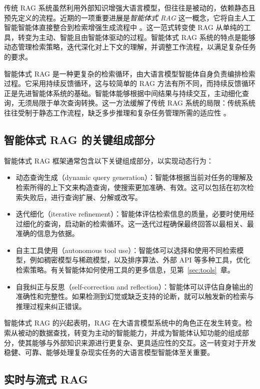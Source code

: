 传统 RAG 系统虽然利用外部知识增强大语言模型，但往往是被动的，依赖静态且预先定义的流程。近期的一项重要进展是\textit{智能体式 RAG} 这一概念，它将自主人工智能智能体直接整合到检索增强生成流程中 \citep{singh2025agentic}。这一范式转变使 RAG 从单纯的工具，转变为主动、智能且由智能体驱动的过程。智能体式 RAG 系统的特点是能够动态管理检索策略，迭代深化对上下文的理解，并调整工作流程，以满足复杂任务的要求。

智能体式 RAG 是一种更复杂的检索循环，由大语言模型智能体自身负责编排检索过程。它采用持续反馈循环，这与较简单的 RAG 方法有所不同，而持续反馈循环正是先进智能体系统的基础。智能体能够根据中间结果与持续交互，主动细化查询，无须局限于单次查询转换。这一方法缓解了传统 RAG 系统的局限：传统系统往往受制于静态工作流程，缺乏多步推理和复杂任务管理所需的适应性 \citep{singh2025agentic}。

\subsection{智能体式 RAG 的关键组成部分}

智能体式 RAG 框架通常包含以下关键组成部分，以实现动态行为：

\begin{itemize}
    \item 动态查询生成（dynamic query generation）：智能体根据当前对任务的理解及检索所得的上下文来构造查询，使搜索更加准确、有效。这可以包括在初次检索失败后，进行查询扩展、分解或改写。
    \item 迭代细化（iterative refinement）：智能体评估检索信息的质量，必要时使用经过细化的查询，启动新的检索循环。这一迭代过程确保最终回答以最相关、最准确的信息为依据。
    \item 自主工具使用（autonomous tool use）：智能体可以选择和使用不同检索模型，例如稠密模型与稀疏模型，以及排序算法、外部 API 等多种工具，优化检索策略。有关智能体如何使用工具的更多信息，见第~\ref{sec:tools}~章。
    \item 自我纠正与反思（self-correction and reflection）：智能体可以评估自身输出的准确性和完整性。如果检测到幻觉或缺乏支持的论断，就可以触发新的检索与推理过程来纠正错误。
\end{itemize}
智能体式 RAG 的兴起表明，RAG 在大语言模型系统中的角色正在发生转变。检索从被动的数据查找，转变为主动的智能能力，并成为智能体认知功能的组成部分，使其能够与外部知识来源进行更复杂、更具适应性的交互。这一转变对于开发稳健、可靠、能够处理复杂现实任务的大语言模型智能体至关重要。



\subsection{实时与流式 RAG}

